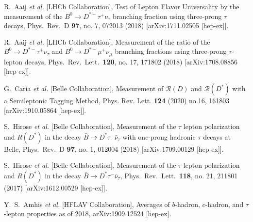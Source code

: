 \documentclass[reprint,showpacs,aps,prd,nofootinbib,superscriptaddress,longbibliography]{revtex4-1}
\begin{document}
\begin{thebibliography}{99}
  R.~Aaij {\it et al.} [LHCb Collaboration],
  Test of Lepton Flavor Universality by the measurement of the $B^0 \to D^{*-} \tau^+ \nu_{\tau}$ branching fraction using three-prong $\tau$ decays,
  Phys.\ Rev.\ D {\bf 97}, no. 7, 072013 (2018)
  [arXiv:1711.02505 [hep-ex]].


  R.~Aaij {\it et al.} [LHCb Collaboration],
  Measurement of the ratio of the $B^0 \to D^{*-} \tau^+ \nu_{\tau}$ and $B^0 \to D^{*-} \mu^+ \nu_{\mu}$ branching fractions using three-prong $\tau$-lepton decays,
  Phys.\ Rev.\ Lett.\  {\bf 120}, no. 17, 171802 (2018)
  [arXiv:1708.08856 [hep-ex]].

G.~Caria \textit{et al.} [Belle Collaboration], Measurement of $\mathcal{R}(D)$ and $\mathcal{R}(D^*)$ with a Semileptonic Tagging Method, 
Phys. Rev. Lett. \textbf{124} (2020) no.16, 161803
[arXiv:1910.05864 [hep-ex]].

  S.~Hirose {\it et al.} [Belle Collaboration],
  Measurement of the $\tau$ lepton polarization and $R(D^*)$ in the decay $\bar{B} \rightarrow D^* \tau^- \bar{\nu}_\tau$ with one-prong hadronic $\tau$ decays at Belle,
  Phys.\ Rev.\ D {\bf 97}, no. 1, 012004 (2018)
  [arXiv:1709.00129 [hep-ex]].


  S.~Hirose {\it et al.} [Belle Collaboration],
  Measurement of the $\tau$ lepton polarization and $R(D^*)$ in the decay $\bar{B} \to D^* \tau^- \bar{\nu}_\tau$,
  Phys.\ Rev.\ Lett.\  {\bf 118}, no. 21, 211801 (2017)
  [arXiv:1612.00529 [hep-ex]].
  
  Y.~S.~Amhis {\it et al.} [HFLAV Collaboration],
  Averages of $b$-hadron, $c$-hadron, and $\tau$-lepton properties as of 2018,
  arXiv:1909.12524 [hep-ex].
  

\end{thebibliography}
\end{document}
